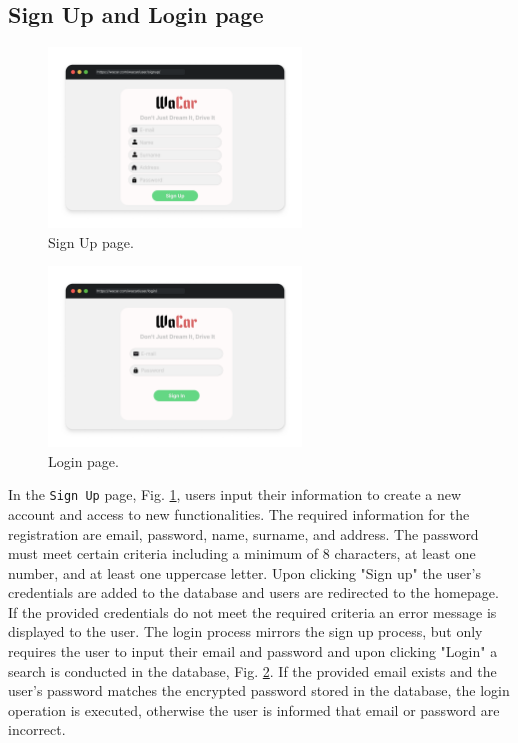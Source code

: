 \subsection{Sign Up and Login page}

\begin{figure}[h]
  \centering
    \includegraphics[width=0.6\textwidth]{mockup/SignUp.png}
    \caption{Sign Up page.}
    \label{fig:signup}
\end{figure}

\begin{figure}[h]
    \centering
    \includegraphics[width=0.6\textwidth]{mockup/Sign in.png}
    \caption{Login page.}
    \label{fig:signin}
\end{figure}

In the \texttt{Sign Up} page, Fig. \ref{fig:signup}, users input their information to create a new account and access to new functionalities. The required information for the registration are email, password, name, surname, and address. The password must meet certain criteria including a minimum of 8 characters, at least one number, and at least one uppercase letter. Upon clicking "Sign up" the user's credentials are added to the database and users are redirected to the homepage. If the provided credentials do not meet the required criteria an error message is displayed to the user. The login process mirrors the sign up process, but only requires the user to input their email and password and upon clicking "Login" a search is conducted in the database, Fig. \ref{fig:signin}. If the provided email exists and the user's password matches the encrypted password stored in the database, the login operation is executed, otherwise the user is informed that email or password are incorrect.

